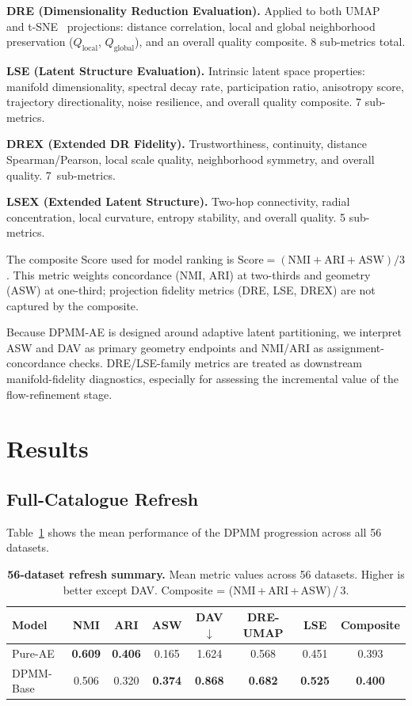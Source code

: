 \documentclass[biology,article,submit,pdftex,moreauthors]{Definitions/mdpi}
\begin{document}
\textbf{DRE (Dimensionality Reduction Evaluation).}
Applied to both UMAP~\cite{mcinnes2018umap} and t-SNE~\cite{vandermaaten2008visualizing} projections: distance correlation, local and global neighborhood preservation ($Q_\text{local}$, $Q_\text{global}$), and an overall quality composite. 8 sub-metrics total.

\textbf{LSE (Latent Structure Evaluation).}
Intrinsic latent space properties: manifold dimensionality, spectral decay rate, participation ratio, anisotropy score, trajectory directionality, noise resilience, and overall quality composite. 7 sub-metrics.

\textbf{DREX (Extended DR Fidelity).}
Trustworthiness, continuity, distance Spearman\slash Pearson, local scale quality, neighborhood symmetry, and overall quality. 7~sub-metrics.

\textbf{LSEX (Extended Latent Structure).}
Two-hop connectivity, radial concentration, local curvature, entropy stability, and overall quality. 5 sub-metrics.

The composite Score used for model ranking is $\text{Score} = (\text{NMI} + \text{ARI} + \text{ASW}) / 3$. This metric weights concordance (NMI, ARI) at two-thirds and geometry (ASW) at one-third; projection fidelity metrics (DRE, LSE, DREX) are not captured by the composite.

Because DPMM-AE is designed around adaptive latent partitioning, we interpret ASW and DAV as primary geometry endpoints and NMI/ARI as assignment-concordance checks. DRE/LSE-family metrics are treated as downstream manifold-fidelity diagnostics, especially for assessing the incremental value of the flow-refinement stage.

\FloatBarrier
\section{Results}\label{sec:results}

\subsection{Full-Catalogue Refresh}
Table~\ref{tab:dpmm_refresh} shows the mean performance of the DPMM progression across all 56 datasets.

\begin{table}[H]
\centering
\caption{\textbf{56-dataset refresh summary.} Mean metric values across 56 datasets. Higher is better except DAV. Composite = (NMI\,+\,ARI\,+\,ASW)\,/\,3.}
\label{tab:dpmm_refresh}
\begin{tabular}{lccccccc}
\toprule
Model & NMI & ARI & ASW & DAV$\downarrow$ & DRE-UMAP & LSE & Composite \\
\midrule
Pure-AE & \textbf{0.609} & \textbf{0.406} & 0.165 & 1.624 & 0.568 & 0.451 & 0.393 \\
DPMM-Base & 0.506 & 0.320 & \textbf{0.374} & \textbf{0.868} & \textbf{0.682} & \textbf{0.525} & \textbf{0.400} \\
\bottomrule
\end{tabular}
\end{table}
\end{document}
